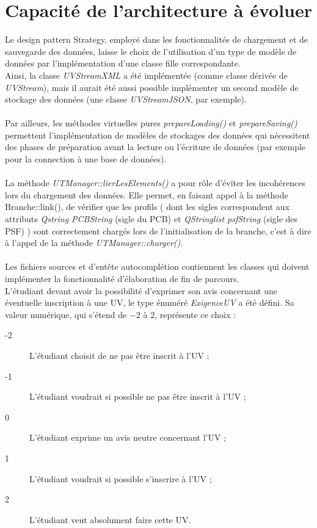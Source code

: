 \documentclass[a4paper,10pt,french]{report}
\begin{document}
        
        
        
\section{Capacité de l'architecture à évoluer}\label{sec:II}

	
	Le design pattern Strategy, employé dans les fonctionnalités de chargement et de sauvegarde des données, laisse le choix de l'utilisation d'un type de modèle de données par l'implémentation d'une classe fille correspondante.\\
	Ainsi, la classe \emph{UVStreamXML} a été implémentée (comme classe dérivée de \emph{UVStream}), mais il aurait été aussi possible implémenter un second modèle de stockage des données (une classe \emph{UVStreamJSON}, par exemple).\\\\
	Par ailleurs, les méthodes virtuelles pures \emph{prepareLoading()} et \emph{prepareSaving()} permettent l'implémentation de modèles de stockages des données qui nécessitent des phases de préparation avant la lecture ou l'écriture de données (par exemple pour la connection à une base de données).\\\\
	
	La méthode \emph{UTManager::lierLesElements()} a pour rôle d'éviter les incohérences lors du chargement des données.
	Elle permet, en faisant appel à la méthode Branche::link(), de vérifier que les profils ( dont les sigles correspondent aux attributs \emph{Qstring PCBString} (sigle du PCB) et \emph{QStringlist psfString} (sigle des PSF) ) sont correctement chargés lors de l'initialisation de la branche, c'est à dire à l'appel de la méthode \emph{UTManager::charger()}.\\\\
	
	
	Les fichiers sources et d'entête autocomplétion contiennent les classes qui doivent implémenter la fonctionnalité d'élaboration de fin  de parcours.\\
	L'étudiant devant avoir la possibilité d'exprimer son avis concernant une éventuelle inscription à une UV, le type énuméré \emph{ExigenceUV} a été défini. Sa valeur numérique, qui s'étend de $-2$ à $2$, représente ce choix : \\
	\begin{description}
	\item[-2] L'étudiant choisit de ne pas être inscrit à l'UV ;
	\item[-1] L'étudiant voudrait si possible ne pas être inscrit à l'UV ;	
	\item[0] L'étudiant exprime un avis neutre concernant l'UV ;
	\item[1] L'étudiant voudrait si possible s'inscrire à l'UV ;
	\item[2] L'étudiant veut absolument faire cette UV.
	\end{description}
	
\end{document}
